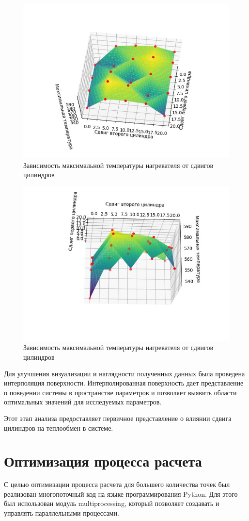 \documentclass[a4paper,12pt]{article}
\theoremstyle{plain} %
\theoremstyle{definition} %
\theoremstyle{remark} %
\begin{document}
\begin{figure}[h]
	\begin{center}
		\includegraphics[width=0.4\linewidth]{16.2.jpg}
		\caption{Зависимость максимальной температуры нагревателя от сдвигов цилиндров} %
	\end{center}
\end{figure}
\newpage
\begin{figure}[h]
	\begin{center}
		\includegraphics[width=0.4\linewidth]{16.3.jpg}
		\caption{Зависимость максимальной температуры нагревателя от сдвигов цилиндров} %
	\end{center}
\end{figure}

Для улучшения визуализации и наглядности полученных данных была проведена интерполяция поверхности. Интерполированная поверхность дает представление о поведении системы в пространстве параметров и позволяет выявить области оптимальных значений для исследуемых параметров.

Этот этап анализа предоставляет первичное представление о влиянии сдвига цилиндров на теплообмен в системе.

\section{Оптимизация процесса расчета}

С целью оптимизации процесса расчета для большего количества точек был реализован многопоточный код на языке программирования Python. Для этого был использован модуль multiprocessing, который позволяет создавать и управлять параллельными процессами.
\end{document}

